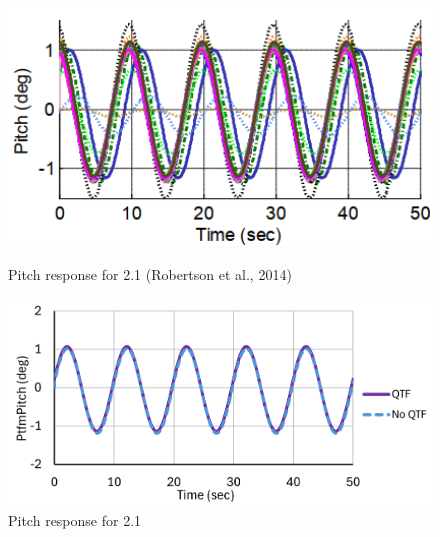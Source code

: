 \documentclass[a4paper, 11pt]{article}
\begin{document}
\begin{figure}[H]
    \begin{minipage}{0.48\textwidth}
        \centering
        \includegraphics[width=1\textwidth]{2.1_pitch.png}
        \caption{\small Pitch response for 2.1 (Robertson et al., 2014)}
        \label{fig:2.1_pitch}
    \end{minipage}
    \hfill
    \begin{minipage}{0.51\textwidth}
        \centering
        \vspace{-0.3cm}
        \includegraphics[width=1\textwidth]{2.1_pitch_mine.png}
        \caption{\small Pitch response for 2.1}
        \label{fig:2.1_pitch_mine}
    \end{minipage}
\end{figure}
\end{document}
